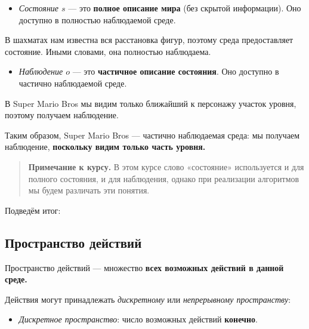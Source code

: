 \documentclass[11pt,a4paper]{article}
\begin{document}
\begin{itemize}
\tightlist
\item
  \emph{Состояние \(s\)} --- это \textbf{полное описание мира} (без скрытой информации). Оно доступно в полностью наблюдаемой среде.
\end{itemize}


В шахматах нам известна вся расстановка фигур, поэтому среда предоставляет состояние. Иными словами, она полностью наблюдаема.

\begin{itemize}
\tightlist
\item
  \emph{Наблюдение \(o\)} --- это \textbf{частичное описание состояния}. Оно доступно в частично наблюдаемой среде.
\end{itemize}


В Super Mario Bros мы видим только ближайший к персонажу участок уровня, поэтому получаем наблюдение.

Таким образом, Super Mario Bros --- частично наблюдаемая среда: мы получаем наблюдение, \textbf{поскольку видим только часть уровня.}

\begin{quote}
\textbf{Примечание к курсу.} В этом курсе слово «состояние» используется и для полного состояния, и для наблюдения, однако при реализации алгоритмов мы будем различать эти понятия.
\end{quote}

Подведём итог:


\subsection{Пространство действий}\label{action-space}

Пространство действий --- множество \textbf{всех возможных действий в данной среде.}

Действия могут принадлежать \emph{дискретному} или \emph{непрерывному пространству}:

\begin{itemize}
\tightlist
\item
  \emph{Дискретное пространство}: число возможных действий \textbf{конечно}.
\end{itemize}
\end{document}
